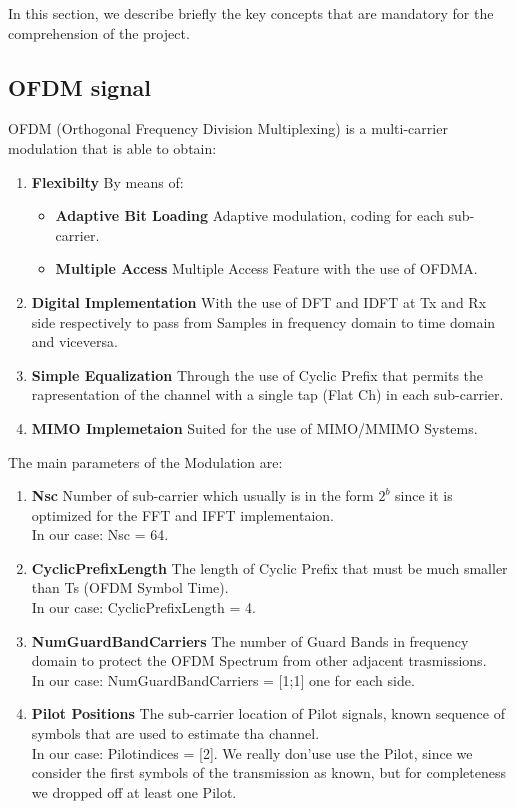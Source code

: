In this section, we describe briefly the key concepts that 
are mandatory for the comprehension of the project.

\subsection{OFDM signal}

OFDM (Orthogonal Frequency Division Multiplexing)
is a multi-carrier modulation that is able to obtain:
\begin{enumerate}
    \item \textbf{Flexibilty} By means of:
    \begin{itemize}
        \item   \textbf{Adaptive Bit Loading} Adaptive modulation, coding for each sub-carrier.
        \item   \textbf{Multiple Access} Multiple Access Feature with the use of OFDMA.
    \end{itemize}
    \item \textbf{Digital Implementation} With the use of DFT and IDFT at Tx and Rx side respectively to pass from Samples in frequency domain to time domain and viceversa.
    \item \textbf{Simple Equalization} Through the use of Cyclic Prefix that permits the rapresentation of the channel with a single tap (Flat Ch) in each sub-carrier.
    \item \textbf{MIMO Implemetaion} Suited for the use of MIMO/MMIMO Systems.
\end{enumerate}

The main parameters of the Modulation are:
\begin{enumerate}
    \item \textbf{Nsc} Number of sub-carrier which usually is in the form $2^{b}$ since it is optimized for the FFT and IFFT implementaion.\\
                        In our case: Nsc = 64.
    \item \textbf{CyclicPrefixLength} The length of Cyclic Prefix that must be much smaller than Ts (OFDM Symbol Time).\\
                        In our case: CyclicPrefixLength = 4.
    \item \textbf{NumGuardBandCarriers} The number of Guard Bands in frequency domain to protect the OFDM Spectrum from other adjacent trasmissions.\\
                        In our case: NumGuardBandCarriers = [1;1] one for each side.
    \item \textbf{Pilot Positions} The sub-carrier location of Pilot signals, known sequence of symbols that are used to estimate tha channel.\\
                        In our case: Pilotindices = [2]. We really don'use use the Pilot, since we consider the first symbols of the transmission as known, but for completeness we dropped off at least one Pilot.
\end{enumerate}


